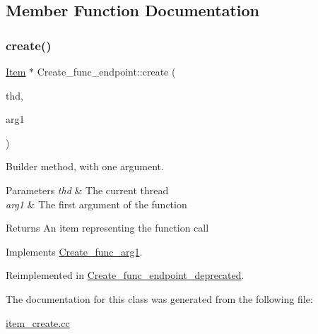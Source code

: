 \subsection{Member Function Documentation}
\mbox{\label{classCreate__func__endpoint_a3e58761794e07878165e882e8d66b7d9}} 
\subsubsection{\texorpdfstring{create()}{create()}}
{\footnotesize\ttfamily \mbox{\hyperlink{classItem}{Item}} $\ast$ Create\+\_\+func\+\_\+endpoint\+::create (\begin{DoxyParamCaption}\item[{T\+HD $\ast$}]{thd,  }\item[{\mbox{\hyperlink{classItem}{Item}} $\ast$}]{arg1 }\end{DoxyParamCaption})\hspace{0.3cm}{\ttfamily [virtual]}}

Builder method, with one argument. 
\begin{DoxyParams}{Parameters}
{\em thd} & The current thread \\
\hline
{\em arg1} & The first argument of the function \\
\hline
\end{DoxyParams}
\begin{DoxyReturn}{Returns}
An item representing the function call 
\end{DoxyReturn}


Implements \mbox{\hyperlink{classCreate__func__arg1_a3e9a98f755cd82c3e762e334c955a8c9}{Create\+\_\+func\+\_\+arg1}}.



Reimplemented in \mbox{\hyperlink{classCreate__func__endpoint__deprecated_ac7c2c610c432d090a6a2935fbc76a1da}{Create\+\_\+func\+\_\+endpoint\+\_\+deprecated}}.



The documentation for this class was generated from the following file\+:\begin{DoxyCompactItemize}
\item 
\mbox{\hyperlink{item__create_8cc}{item\+\_\+create.\+cc}}\end{DoxyCompactItemize}
